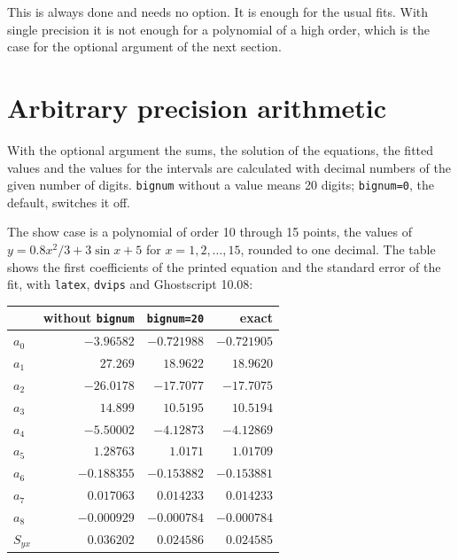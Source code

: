 \documentclass[11pt,english,BCOR10mm,DIV12,bibliography=totoc,parskip=false,
   smallheadings, headexclude,footexclude,oneside]{pst-doc}
\let\Section\section
\def\section{\clearpage\Section}
\begin{document}
\medskip
This is always done and needs no option. It is enough for the usual fits. With
single precision it is not enough for a polynomial of a high order, which
is the case for the optional argument  of the next section.

\section{Arbitrary precision arithmetic}
With the optional argument  the sums, the solution of the
equations, the fitted values and the values for the intervals are calculated
with decimal numbers of the given number of digits. \texttt{bignum} without a
value means 20 digits; \texttt{bignum=0}, the default, switches it off.

\medskip
\noindent{}

\medskip
The show case is a polynomial of order 10 through 15 points, the values of
$y=0.8x^2/3+3\sin x+5$ for $x=1,2,\ldots,15$, rounded to one decimal. The table
shows the first coefficients of the printed equation and the standard error
of the fit, with \texttt{latex}, \texttt{dvips} and Ghostscript 10.08:

\medskip
\begin{tabular}{@{}lrrr@{}}\hline
 & without \texttt{bignum} & \texttt{bignum=20} & exact\\\hline
$a_0$ & $-3.96582$ & $-0.721988$ & $-0.721905$\\
$a_1$ & $27.269$ & $18.9622$ & $18.9620$\\
$a_2$ & $-26.0178$ & $-17.7077$ & $-17.7075$\\
$a_3$ & $14.899$ & $10.5195$ & $10.5194$\\
$a_4$ & $-5.50002$ & $-4.12873$ & $-4.12869$\\
$a_5$ & $1.28763$ & $1.0171$ & $1.01709$\\
$a_6$ & $-0.188355$ & $-0.153882$ & $-0.153881$\\
$a_7$ & $0.017063$ & $0.014233$ & $0.014233$\\
$a_8$ & $-0.000929$ & $-0.000784$ & $-0.000784$\\
$S_{yx}$ & $0.036202$ & $0.024586$ & $0.024585$\\\hline
\end{tabular}
\end{document}
